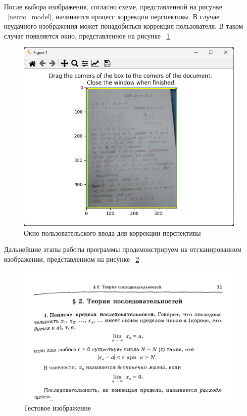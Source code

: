После выбора изображения, согласно схеме, представленной на рисунке ~\ref{neuro_model}, начинается процесс коррекции перспективы. В случае неудачного изображения может понадобиться коррекция пользователя. В таком случае появляется окно, представленное на рисунке ~\ref{perspective_correction_window}

\begin{figure}
    \includegraphics[scale=0.75]{img/app/perspective_correction_window.png}
    \caption{Окно пользовательского ввода для коррекции перспективы}
    \label{perspective_correction_window}
\end{figure}

Дальнейшие этапы работы программы продемонстрируем на отсканированном изображении, представленном на рисунке ~\ref{test_input}

\begin{figure}
    \includegraphics[scale=0.75]{img/app/input_image.jpg}
    \caption{Тестовое изображение}
    \label{test_input}
\end{figure}

